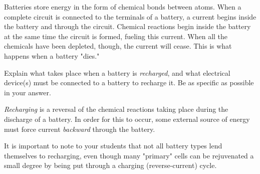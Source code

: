 

Batteries store energy in the form of chemical bonds between atoms.  When a complete circuit is connected to the terminals of a battery, a current begins inside the battery and through the circuit.  Chemical reactions begin inside the battery at the same time the circuit is formed, fueling this current.  When all the chemicals have been depleted, though, the current will cease.  This is what happens when a battery "dies."

Explain what takes place when a battery is {\it recharged}, and what electrical device(s) must be connected to a battery to recharge it.  Be as specific as possible in your answer.







{\it Recharging} is a reversal of the chemical reactions taking place during the discharge of a battery.  In order for this to occur, some external source of energy must force current {\it backward} through the battery.







It is important to note to your students that not all battery types lend themselves to recharging, even though many "primary" cells can be rejuvenated a small degree by being put through a charging (reverse-current) cycle.




